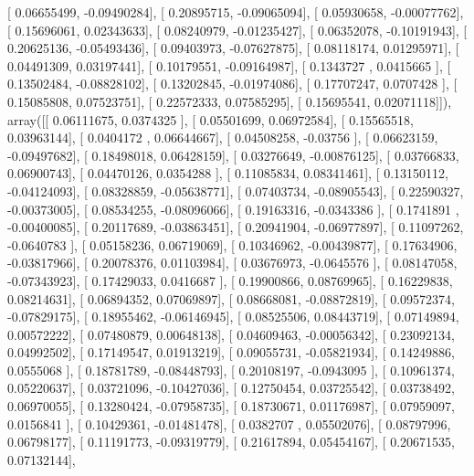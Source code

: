 \documentclass{article}
\begin{document}
       [ 0.06655499, -0.09490284],
       [ 0.20895715, -0.09065094],
       [ 0.05930658, -0.00077762],
       [ 0.15696061,  0.02343633],
       [ 0.08240979, -0.01235427],
       [ 0.06352078, -0.10191943],
       [ 0.20625136, -0.05493436],
       [ 0.09403973, -0.07627875],
       [ 0.08118174,  0.01295971],
       [ 0.04491309,  0.03197441],
       [ 0.10179551, -0.09164987],
       [ 0.1343727 ,  0.0415665 ],
       [ 0.13502484, -0.08828102],
       [ 0.13202845, -0.01974086],
       [ 0.17707247,  0.0707428 ],
       [ 0.15085808,  0.07523751],
       [ 0.22572333,  0.07585295],
       [ 0.15695541,  0.02071118]]), array([[ 0.06111675,  0.0374325 ],
       [ 0.05501699,  0.06972584],
       [ 0.15565518,  0.03963144],
       [ 0.0404172 ,  0.06644667],
       [ 0.04508258, -0.03756   ],
       [ 0.06623159, -0.09497682],
       [ 0.18498018,  0.06428159],
       [ 0.03276649, -0.00876125],
       [ 0.03766833,  0.06900743],
       [ 0.04470126,  0.0354288 ],
       [ 0.11085834,  0.08341461],
       [ 0.13150112, -0.04124093],
       [ 0.08328859, -0.05638771],
       [ 0.07403734, -0.08905543],
       [ 0.22590327, -0.00373005],
       [ 0.08534255, -0.08096066],
       [ 0.19163316, -0.0343386 ],
       [ 0.1741891 , -0.00400085],
       [ 0.20117689, -0.03863451],
       [ 0.20941904, -0.06977897],
       [ 0.11097262, -0.0640783 ],
       [ 0.05158236,  0.06719069],
       [ 0.10346962, -0.00439877],
       [ 0.17634906, -0.03817966],
       [ 0.20078376,  0.01103984],
       [ 0.03676973, -0.0645576 ],
       [ 0.08147058, -0.07343923],
       [ 0.17429033,  0.0416687 ],
       [ 0.19900866,  0.08769965],
       [ 0.16229838,  0.08214631],
       [ 0.06894352,  0.07069897],
       [ 0.08668081, -0.08872819],
       [ 0.09572374, -0.07829175],
       [ 0.18955462, -0.06146945],
       [ 0.08525506,  0.08443719],
       [ 0.07149894,  0.00572222],
       [ 0.07480879,  0.00648138],
       [ 0.04609463, -0.00056342],
       [ 0.23092134,  0.04992502],
       [ 0.17149547,  0.01913219],
       [ 0.09055731, -0.05821934],
       [ 0.14249886,  0.0555068 ],
       [ 0.18781789, -0.08448793],
       [ 0.20108197, -0.0943095 ],
       [ 0.10961374,  0.05220637],
       [ 0.03721096, -0.10427036],
       [ 0.12750454,  0.03725542],
       [ 0.03738492,  0.06970055],
       [ 0.13280424, -0.07958735],
       [ 0.18730671,  0.01176987],
       [ 0.07959097,  0.0156841 ],
       [ 0.10429361, -0.01481478],
       [ 0.0382707 ,  0.05502076],
       [ 0.08797996,  0.06798177],
       [ 0.11191773, -0.09319779],
       [ 0.21617894,  0.05454167],
       [ 0.20671535,  0.07132144],
\end{document}
